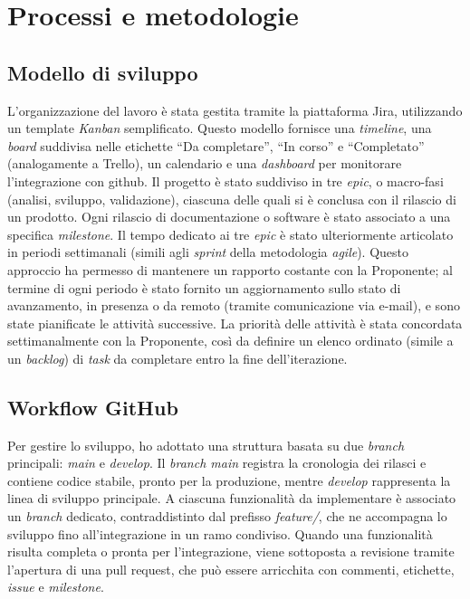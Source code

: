 \chapter{Processi e metodologie}
\label{cap:processi-metodologie}


\section{Modello di sviluppo}

\par L’organizzazione del lavoro è stata gestita tramite la piattaforma Jira, utilizzando un template \textit{Kanban} semplificato. Questo modello fornisce una \textit{timeline}, una \textit{board} suddivisa nelle etichette “Da completare”, “In corso” e “Completato” (analogamente a Trello), un calendario e una \textit{dashboard} per monitorare l’integrazione con \gls{github}. Il progetto è stato suddiviso in tre \textit{epic}, o macro-fasi (analisi, sviluppo, validazione), ciascuna delle quali si è conclusa con il rilascio di un prodotto. Ogni rilascio di documentazione o software è stato associato a una specifica \textit{milestone}. Il tempo dedicato ai tre \textit{epic} è stato ulteriormente articolato in periodi settimanali (simili agli \textit{sprint} della metodologia \textit{agile}). Questo approccio ha permesso di mantenere un rapporto costante con la Proponente; al termine di ogni periodo è stato fornito un aggiornamento sullo stato di avanzamento, in presenza o da remoto (tramite comunicazione via e-mail), e sono state pianificate le attività successive. La priorità delle attività è stata concordata settimanalmente con la Proponente, così da definire un elenco ordinato (simile a un \textit{backlog}) di \textit{task} da completare entro la fine dell’iterazione.

\section{Workflow GitHub}

\par Per gestire lo sviluppo, ho adottato una struttura basata su due \textit{branch} principali: \textit{main} e \textit{develop}. Il \textit{branch main} registra la cronologia dei rilasci e contiene codice stabile, pronto per la produzione, mentre \textit{develop} rappresenta la linea di sviluppo principale. A ciascuna funzionalità da implementare è associato un \textit{branch} dedicato, contraddistinto dal prefisso \textit{feature/}, che ne accompagna lo sviluppo fino all’integrazione in un ramo condiviso. Quando una funzionalità risulta completa o pronta per l’integrazione, viene sottoposta a revisione tramite l’apertura di una \gls{pull request}, che può essere arricchita con commenti, etichette, \textit{issue} e \textit{milestone}.

